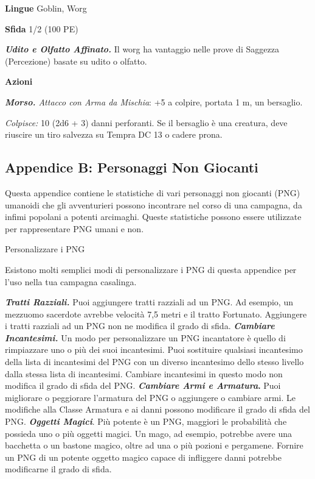 \begin{multicols}{2}
\textbf{Lingue} Goblin, Worg

\textbf{Sfida} 1/2 (100 PE)\smallskip

\emph{\textbf{Udito e Olfatto Affinato.}} Il worg ha vantaggio nelle
prove di Saggezza (Percezione) basate su udito o olfatto.

\smallskip\textbf{Azioni}

\emph{\textbf{Morso.} Attacco con Arma da Mischia}: +5 a colpire,
portata 1 m, un bersaglio.

\emph{Colpisce:} 10 (2d6 + 3) danni perforanti. Se il bersaglio è una
creatura, deve riuscire un tiro salvezza su Tempra DC 13 o cadere prona.

\pagebreak

\subsection{Appendice B: Personaggi Non Giocanti}

Questa appendice contiene le statistiche di vari personaggi non giocanti
(PNG) umanoidi che gli avventurieri possono incontrare nel corso di una
campagna, da infimi popolani a potenti arcimaghi. Queste statistiche
possono essere utilizzate per rappresentare PNG umani e non.

Personalizzare i PNG

Esistono molti semplici modi di personalizzare i PNG di questa appendice
per l'uso nella tua campagna casalinga.

\emph{\textbf{Tratti Razziali.}} Puoi aggiungere tratti razziali ad un
PNG. Ad esempio, un mezzuomo sacerdote avrebbe velocità 7,5 metri e il
tratto Fortunato. Aggiungere i tratti razziali ad un PNG non ne modifica
il grado di sfida. \emph{\textbf{Cambiare Incantesimi.}} Un modo per
personalizzare un PNG incantatore è quello di rimpiazzare uno o più dei
suoi incantesimi. Puoi sostituire qualsiasi incantesimo della lista di
incantesimi del PNG con un diverso incantesimo dello stesso livello
dalla stessa lista di incantesimi. Cambiare incantesimi in questo modo
non modifica il grado di sfida del PNG. \textbf{\emph{Cambiare Armi e
Armatura}.} Puoi migliorare o peggiorare l'armatura del PNG o aggiungere
o cambiare armi. Le modifiche alla Classe Armatura e ai danni possono
modificare il grado di sfida del PNG. \emph{\textbf{Oggetti Magici}}.
Più potente è un PNG, maggiori le probabilità che possieda uno o più
oggetti magici. Un mago, ad esempio, potrebbe avere una bacchetta o un
bastone magico, oltre ad una o più pozioni e pergamene. Fornire un PNG
di un potente oggetto magico capace di infliggere danni potrebbe
modificarne il grado di sfida.


\end{multicols}
